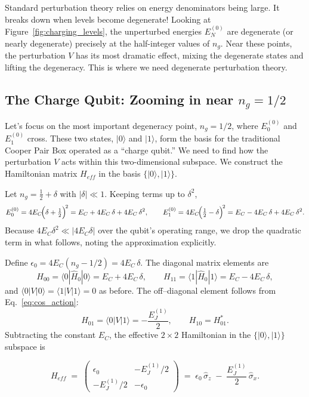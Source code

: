 \documentclass{book}
\begin{document}
Standard perturbation theory relies on energy denominators being large. It breaks down when levels become degenerate! Looking at Figure~\ref{fig:charging_levels}, the unperturbed energies \(E_N^{(0)}\) are degenerate (or nearly degenerate) precisely at the half-integer values of \(n_g\). Near these points, the perturbation \(V\) has its most dramatic effect, mixing the degenerate states and lifting the degeneracy. This is where we need degenerate perturbation theory.

\subsection[The Charge Qubit: Zooming in near n_g = 1/2]{The Charge Qubit: Zooming in near \(n_g = 1/2\)}
\label{subsec:charge_qubit}

Let's focus on the most important degeneracy point, \(n_g = 1/2\), where \(E_0^{(0)}\) and \(E_1^{(0)}\) cross.  These two states, \(|0\rangle\) and \(|1\rangle\), form the basis for the traditional Cooper Pair Box operated as a “charge qubit.”  We need to find how the perturbation \(V\) acts within this two-dimensional subspace.  We construct the Hamiltonian matrix \(H_{eff}\) in the basis \(\{|0\rangle, |1\rangle\}\).

Let \(n_g = \tfrac12 + \delta\) with \(|\delta|\ll1\).  Keeping terms up to \(\delta^2\),
\[
E_0^{(0)} = 4E_C\!\Bigl(\delta+\tfrac12\Bigr)^{\!2}
          = E_C + 4E_C\,\delta + 4E_C\,\delta^{2},\qquad
E_1^{(0)} = 4E_C\!\Bigl(\tfrac12-\delta\Bigr)^{\!2}
          = E_C - 4E_C\,\delta + 4E_C\,\delta^{2}.
\]
Because \(4E_C\delta^{2}\ll|4E_C\delta|\) over the qubit’s operating range,
we drop the quadratic term in what follows, noting the approximation explicitly.

Define \(\epsilon_0 = 4E_C(n_g - 1/2) = 4E_C\,\delta\).  The diagonal matrix elements are
\[
H_{00} = \langle0|\hat H_0|0\rangle = E_C + 4E_C\,\delta,\qquad
H_{11} = \langle1|\hat H_0|1\rangle = E_C - 4E_C\,\delta,
\]
and \(\langle 0|V|0\rangle = \langle1|V|1\rangle = 0\) as before.  The off–diagonal element follows from Eq.~\ref{eq:cos_action}:
\[
H_{01} = \langle0|V|1\rangle = -\frac{E_J^{(1)}}{2}, 
\qquad
H_{10} = H_{01}^*.
\]
Subtracting the constant \(E_C\), the effective \(2\times2\) Hamiltonian in the \(\{|0\rangle,|1\rangle\}\) subspace is

\[
H_{eff} \;=\; 
\begin{pmatrix}
\epsilon_0 & -E_J^{(1)}/2\\
-E_J^{(1)}/2 & -\epsilon_0
\end{pmatrix}
\;=\;
\epsilon_0\,\hat\sigma_z \;-\;\frac{E_J^{(1)}}{2}\,\hat\sigma_x.
\]
\end{document}
